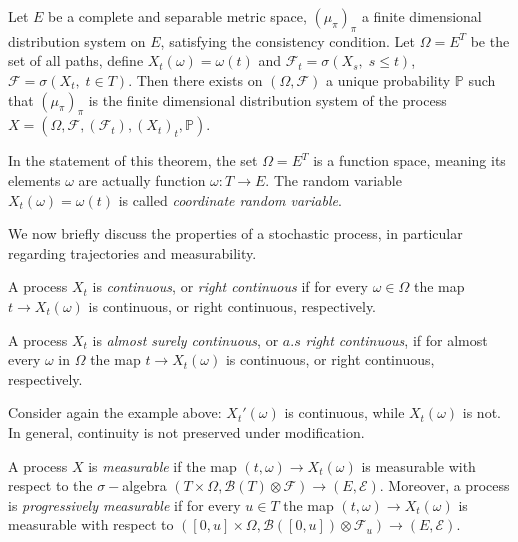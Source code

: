 \begin{theorem}
    Let $E$ be a complete and separable metric space, $(\mu_{\pi})_{\pi}$ a finite dimensional distribution system on $E$, satisfying the consistency condition. Let $\Omega = E^T$ be the set of all paths, define $X_t(\omega) = \omega(t)$ and $\mathcal{F}_t = \sigma(X_s, \; s\leq t)$, $\mathcal{F} = \sigma(X_t, \; t \in T)$. Then there exists on $(\Omega, \mathcal{F})$ a unique probability $\mathbb{P}$ such that $(\mu_{\pi})_{\pi}$ is the finite dimensional distribution system of the process $X = (\Omega, \mathcal{F}, (\mathcal{F}_t), (X_t)_t, \mathbb{P})$. 
\end{theorem}

In the statement of this theorem, the set $\Omega = E^T$ is a function space, meaning its elements $\omega$ are actually function $\omega : T \to E$. The random variable $X_t(\omega) = \omega(t)$ is called \textit{coordinate random variable}. 

We now briefly discuss the properties of a stochastic process, in particular regarding trajectories and measurability. 

\begin{definition}
    A process $X_t$ is \textit{continuous}, or \textit{right continuous} if for every $\omega \in \Omega$ the map $t \to X_t(\omega)$ is continuous, or right continuous, respectively.
\end{definition}
\begin{definition}
    A process $X_t$ is \textit{almost surely continuous}, or $a.s$ \textit{right continuous}, if for almost every $\omega$ in $\Omega$ the map $t \to X_t(\omega)$ is continuous, or right continuous, respectively. 
\end{definition}


Consider again the example above: $X_t'(\omega)$ is continuous, while $X_t(\omega)$ is not. In general, continuity is not preserved under modification. 

\begin{definition}
    A process $X$ is \textit{measurable} if the map $(t,\omega) \to X_t(\omega)$ is measurable with respect to the $\sigma-$algebra $(T\times \Omega,\mathcal{B}(T) \otimes \mathcal{F}) \to (E,\mathcal{E})$. Moreover, a process is \textit{progressively measurable} if  for every $u \in T$ the map $(t,\omega) \to X_t(\omega)$ is measurable with respect to $([0,u] \times \Omega, \mathcal{B}([0,u]) \otimes \mathcal{F}_u) \to (E,\mathcal{E})$. 
\end{definition}

